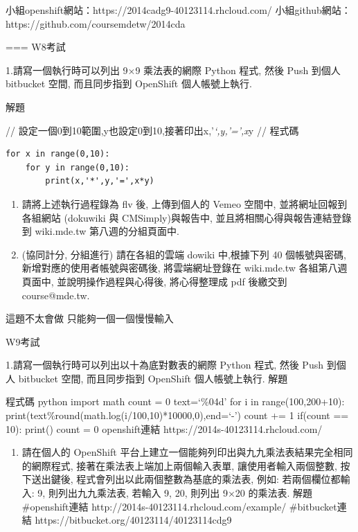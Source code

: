\documentclass[]{article}
\begin{document}
小組openshift網站：https://2014cadg9-40123114.rhcloud.com/
小組github網站：https://github.com/coursemdetw/2014cda

=== W8考試

1.請寫一個執行時可以列出 9×9 乘法表的網際 Python 程式, 然後 Push 到個人
bitbucket 空間, 而且同步指到 OpenShift 個人帳號上執行.

解題

// 設定一個0到10範圍,y也設定0到10,接著印出x,'\emph{`,y,'=',x}y // 程式碼

\begin{verbatim}
for x in range(0,10):
    for y in range(0,10):
        print(x,'*',y,'=',x*y)
\end{verbatim}

\begin{enumerate}
\def\labelenumi{\arabic{enumi}.}
\setcounter{enumi}{1}
\item
  請將上述執行過程錄為 flv 後, 上傳到個人的 Vemeo 空間中,
  並將網址回報到各組網站 (dokuwiki 與 CMSimply)與報告中,
  並且將相關心得與報告連結登錄到 wiki.mde.tw 第八週的分組頁面中.
\item
  (協同計分, 分組進行) 請在各組的雲端 dowiki 中,根據下列 40
  個帳號與密碼, 新增對應的使用者帳號與密碼後, 將雲端網址登錄在
  wiki.mde.tw 各組第八週頁面中, 並說明操作過程與心得後, 將心得整理成 pdf
  後繳交到 course@mde.tw.
\end{enumerate}

這題不太會做 只能夠一個一個慢慢輸入

W9考試

1.請寫一個執行時可以列出以十為底對數表的網際 Python 程式, 然後 Push
到個人 bitbucket 空間, 而且同步指到 OpenShift 個人帳號上執行. 解題

程式碼 python import math count = 0 text=`\%04d' for i in
range(100,200+10):
print(text\%round(math.log(i/100,10)*10000,0),end=`-') count += 1
if(count == 10): print() count = 0 openshift連結
https://2014s-40123114.rhcloud.com/

\begin{enumerate}
\def\labelenumi{\arabic{enumi}.}
\setcounter{enumi}{1}
\itemsep1pt\parskip0pt
\item
  請在個人的 OpenShift
  平台上建立一個能夠列印出與九九乘法表結果完全相同的網際程式,
  接著在乘法表上端加上兩個輸入表單, 讓使用者輸入兩個整數, 按下送出鍵後,
  程式會列出以此兩個整數為基底的乘法表, 例如: 若兩個欄位都輸入: 9,
  則列出九九乘法表, 若輸入 9, 20, 則列出 9×20 的乘法表. 解題
  \#openshift連結 http://2014s-40123114.rhcloud.com/example/
  \#bitbucket連結 https://bitbucket.org/40123114/40123114cdg9
\end{enumerate}
\end{document}

